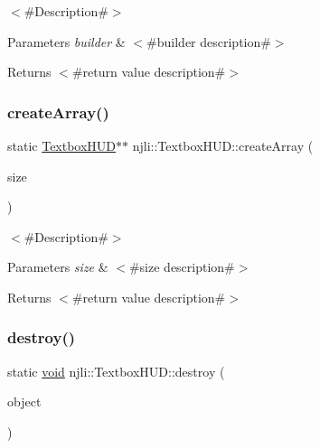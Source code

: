 $<$\#\+Description\#$>$


\begin{DoxyParams}{Parameters}
{\em builder} & $<$\#builder description\#$>$\\
\hline
\end{DoxyParams}
\begin{DoxyReturn}{Returns}
$<$\#return value description\#$>$ 
\end{DoxyReturn}
\mbox{\label{classnjli_1_1_textbox_h_u_d_a0d83157abc6c7cd42cc13fa0b3c946f1}} 
\subsubsection{\texorpdfstring{create\+Array()}{createArray()}}
{\footnotesize\ttfamily static \mbox{\hyperlink{classnjli_1_1_textbox_h_u_d}{Textbox\+H\+UD}}$\ast$$\ast$ njli\+::\+Textbox\+H\+U\+D\+::create\+Array (\begin{DoxyParamCaption}\item[{const \mbox{\hyperlink{_util_8h_a10e94b422ef0c20dcdec20d31a1f5049}{u32}}}]{size }\end{DoxyParamCaption})\hspace{0.3cm}{\ttfamily [static]}}

$<$\#\+Description\#$>$


\begin{DoxyParams}{Parameters}
{\em size} & $<$\#size description\#$>$\\
\hline
\end{DoxyParams}
\begin{DoxyReturn}{Returns}
$<$\#return value description\#$>$ 
\end{DoxyReturn}
\mbox{\label{classnjli_1_1_textbox_h_u_d_a1d75f71707ec7b6bfb42c774ef29bfca}} 
\subsubsection{\texorpdfstring{destroy()}{destroy()}}
{\footnotesize\ttfamily static \mbox{\hyperlink{_thread_8h_af1e856da2e658414cb2456cb6f7ebc66}{void}} njli\+::\+Textbox\+H\+U\+D\+::destroy (\begin{DoxyParamCaption}\item[{\mbox{\hyperlink{classnjli_1_1_textbox_h_u_d}{Textbox\+H\+UD}} $\ast$}]{object }\end{DoxyParamCaption})\hspace{0.3cm}{\ttfamily [static]}}

